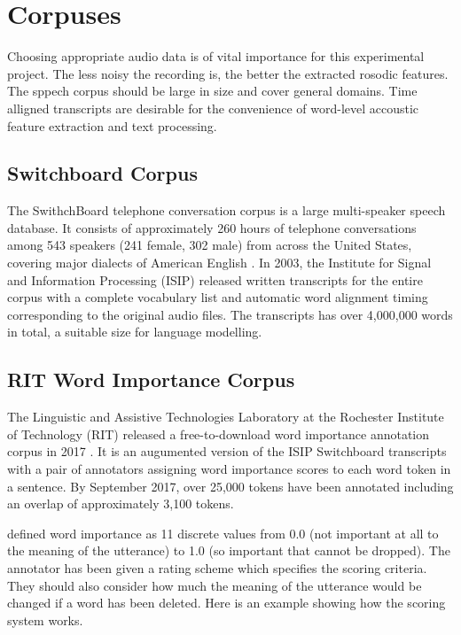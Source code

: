 \section{Corpuses}
Choosing appropriate audio data is of vital importance for this experimental project. The less noisy the recording is, the better the extracted rosodic features. The sppech corpus should be large in size and cover general domains. Time alligned transcripts are desirable for the convenience of word-level accoustic feature extraction and text processing. 

\subsection{Switchboard Corpus}
The SwithchBoard telephone conversation corpus is a large multi-speaker speech database. It consists of approximately 260 hours of telephone conversations among 543 speakers (241 female, 302 male) from across the United States, covering major dialects of American English\citep{Godfrey1992} . In 2003, the Institute for Signal and Information Processing (ISIP) released written transcripts for the entire corpus with a complete vocabulary list and automatic word alignment timing corresponding to the original audio files. The transcripts has over 4,000,000 words in total, a suitable size for language modelling.


\subsection{RIT Word Importance Corpus}
The Linguistic and Assistive Technologies Laboratory at the Rochester Institute of Technology (RIT) released a free-to-download word importance annotation corpus in 2017  \citep{Kafle2018}. It is an augumented version of the ISIP Switchboard transcripts with a pair of annotators assigning word importance scores to each word token in a sentence. By September 2017, over 25,000 tokens have been annotated including an overlap of approximately 3,100 tokens. 

\citet{Kafle2018} defined word importance as 11 discrete values from 0.0 (not important
at all to the meaning of the utterance) to 1.0 (so important that cannot be dropped). The annotator has been given a rating scheme which specifies the scoring criteria. They should also consider how much the meaning of the utterance would be changed if a word has been deleted. Here is an example showing how the scoring system works.

